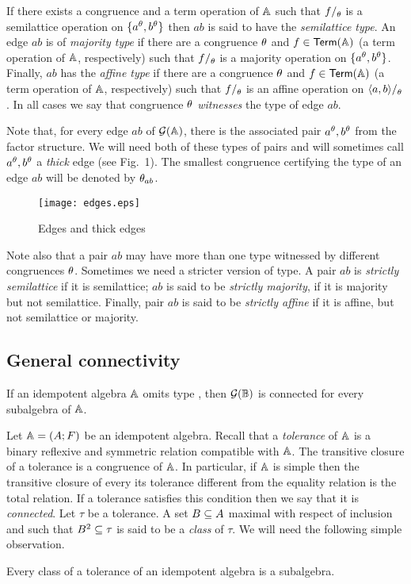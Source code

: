 \documentclass[11pt]{article}
\begin{document}
If there exists a congruence and a term operation of ${\mathbb A}$ such that $f\fac\th$ 
is a semilattice operation on $\{a^\theta,b^\theta\}$ then $ab$ is said to have the
{\em semilattice type}. An edge $ab$ is of {\em majority type} if there are 
a congruence $\theta$ and $f\in{\sf Term}({\mathbb A})$ (a term operation of ${\mathbb A}$, respectively)
 such that $f\fac\th$ is a majority operation on $\{a^\theta,b^\theta\}$. Finally, $ab$ 
has the {\em affine type} if there are a congruence $\theta$ and $f\in{\sf Term}({\mathbb A})$ 
(a term operation of ${\mathbb A}$, respectively) such that $f\fac\th$ is an affine operation 
on $\ang{a,b}\fac\th$.  In all cases we say that congruence $\theta$ \emph{witnesses}
the type of edge $ab$.

Note that, for every edge $ab$ of ${\mathcal G}({\mathbb A})$, there is the associated pair 
$a^\theta,b^\theta$ from the factor structure. We will need both of these types of pairs 
and will sometimes call $a^\theta,b^\theta$ a {\em thick} edge (see Fig.~1). The 
smallest congruence certifying the type of an edge $ab$ will be denoted by $\theta_{ab}$. 
\begin{figure}[t]
\centerline{\texttt{[image: edges.eps]}}
\caption{Edges and thick edges}
\end{figure}

Note also that a pair $ab$ may have more than one type witnessed by different 
congruences $\theta$. Sometimes we need a stricter version of type. A pair $ab$
is \emph{strictly semilattice} if it is semilattice; $ab$ is said to be \emph{strictly
majority}, if it is majority but not semilattice. Finally, pair $ab$ is said to be 
\emph{strictly affine} if it is affine, but not semilattice or majority.


\subsection{General connectivity}\label{sec:general-connectivity}

\begin{theorem}\label{the:connectedness}
If an idempotent algebra ${\mathbb A}$ omits type \one, then ${\mathcal G}({\mathbb B})$ is connected
for every subalgebra of ${\mathbb A}$.
\end{theorem}

Let ${\mathbb A}=(A;F)$ be an idempotent algebra. Recall that a {\em
tolerance} of ${\mathbb A}$ is a binary reflexive and symmetric
relation compatible with ${\mathbb A}$. The transitive closure of a tolerance is a
congruence of ${\mathbb A}$. In particular, if ${\mathbb A}$ is simple then the transitive
closure of every its tolerance different from the equality relation is
the total relation. If a tolerance satisfies this condition then we
say that it is {\em connected}. Let $\tau$ be a tolerance. A set
$B\subseteq A$ maximal with respect of inclusion and such that $B^2\subseteq
\tau$ is said to be a {\em class} of $\tau$. We will need the following 
simple observation.
\begin{lemma}\label{lem:tol-class}
Every class of a tolerance of an idempotent algebra is a subalgebra.
\end{lemma}
\end{document}

